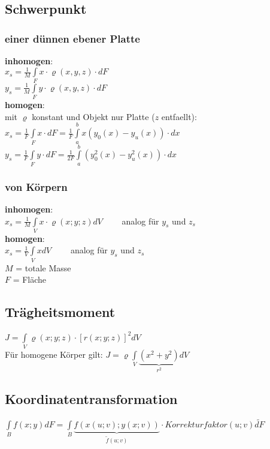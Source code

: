 \subsection{Schwerpunkt}
  \begin{multicols}{2}
    \subsubsection{einer dünnen ebener Platte}
      \textbf{inhomogen}:\\
        $x_s=\frac{1}{M} \int\limits_F x \cdot \varrho(x,y,z)\cdot dF$\\
        $y_s=\frac{1}{M} \int\limits_F y \cdot \varrho(x,y,z)\cdot dF$\\
      \textbf{homogen}:\\
        mit $\varrho$ konstant und Objekt nur Platte ($z$ entfaellt):\\
        $x_s=\frac{1}{F} \int\limits_F x\cdot dF = \frac{1}{F} \int\limits_a^b
        x(y_0(x)-y_u(x))\cdot dx$ \\
        $y_s=\frac{1}{F} \int\limits_F y\cdot dF = \frac{1}{2F} \int\limits_a^b
        (y_0^2(x)-y_u^2(x))\cdot dx$ \\
    \columnbreak
    
    \subsubsection{von Körpern}
      \textbf{inhomogen}: \\
        $x_s = \frac{1}{M}\int\limits_V x \cdot \varrho(x;y;z) dV \qquad$ analog für $y_s$ und $z_s$\\
      \textbf{homogen}: \\
        $x_s = \frac{1}{V}\int\limits_V x dV \qquad$ analog für $y_s$ und $z_s$\\
      
      $M$ = totale Masse\\
      $F$ = Fläche
  \end{multicols}
  
\subsection{Trägheitsmoment}
  $J = \int\limits_V \varrho(x;y;z) \cdot [r(x;y;z)]^2 dV$ \\
  Für homogene Körper gilt: $J = \varrho \int\limits_V \underbrace{(x^2+y^2)}_{r^2}dV$

\subsection{Koordinatentransformation}
  $\int\limits_B f(x;y) dF = \int\limits_B \underbrace{f(x(u;v); y(x;v))}_{\tilde{f}(u;v)} \cdot Korrekturfaktor(u;v) \tilde{dF}$
  
